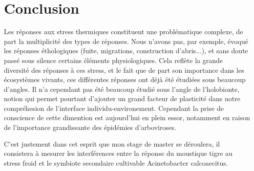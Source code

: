 
\section*{Conclusion}

Les réponses aux stress thermiques constituent une problématique complexe, de part la multiplicité des types de réponses. 
Nous n'avons pas, par exemple, évoqué les réponses éthologiques (fuite, migrations, construction d'abris...), et sans doute passé sous silence certains éléments physiologiques.
Cela reflète la grande diversité des réponses à ces stress, et le fait que de part son importance dans les écosystèmes vivants, ces différentes réponses ont déjà été étudiées sous beaucoup d'angles.
Il n'a cependant pas été beaucoup étudié sous l'angle de l'holobionte, notion qui permet pourtant d'ajouter un grand facteur de plasticité dans notre compréhesion de l'interface individu-environement.
Cependant la prise de conscience de cette dimention est aujourd'hui en plein essor, notamment en raison de l'importance grandissante des épidémies d'arboviroses.

C'est justement dans cet esprit que mon stage de master se déroulera, il consistera à mesurer les interférences entre la réponse du moustique tigre  au stress froid et le symbiote secondaire cultivable Acinetobacter calcoaecitus.

